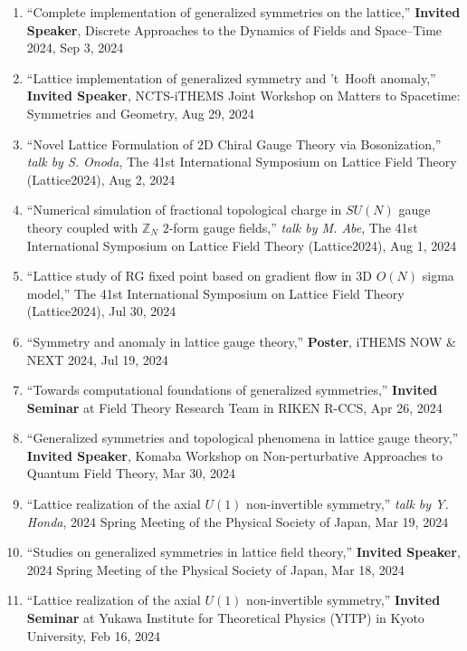 \begin{enumerate}
       \textit{talk by M. Abe},
       2024 Annual (79th) Meeting of the Physical Society of Japan, Sep 16, 2024
 \item ``Complete implementation of generalized symmetries on the lattice,''
       \textbf{Invited Speaker},
       Discrete Approaches to the Dynamics of Fields and Space–Time 2024, Sep 3, 2024
 \item ``Lattice implementation of generalized symmetry and 't~Hooft anomaly,''
       \textbf{Invited Speaker},
       NCTS-iTHEMS Joint Workshop on Matters to Spacetime: Symmetries and Geometry, Aug 29, 2024
 \item ``Novel Lattice Formulation of $2$D Chiral Gauge Theory via Bosonization,''
       \textit{talk by S. Onoda},
       The 41st International Symposium on Lattice Field Theory (Lattice2024), Aug 2, 2024
 \item ``Numerical simulation of fractional topological charge in $SU(N)$ gauge theory coupled with $\mathbb{Z}_N$ $2$-form gauge fields,''
       \textit{talk by M. Abe},
       The 41st International Symposium on Lattice Field Theory (Lattice2024), Aug 1, 2024
 \item ``Lattice study of RG fixed point based on gradient flow in $3$D $O(N)$ sigma model,''
       The 41st International Symposium on Lattice Field Theory (Lattice2024), Jul 30, 2024
 \item ``Symmetry and anomaly in lattice gauge theory,''
       \textbf{Poster}, iTHEMS NOW \& NEXT 2024, Jul 19, 2024
 \item ``Towards computational foundations of generalized symmetries,''
       \textbf{Invited Seminar} at Field Theory Research Team in RIKEN R-CCS, Apr 26, 2024
 \item ``Generalized symmetries and topological phenomena in lattice gauge theory,''
       \textbf{Invited Speaker},
       Komaba Workshop on Non-perturbative Approaches to Quantum Field Theory, Mar 30, 2024
 \item ``Lattice realization of the axial $U(1)$ non-invertible symmetry,''
       \textit{talk by Y. Honda},
       2024 Spring Meeting of the Physical Society of Japan, Mar 19, 2024
 \item ``Studies on generalized symmetries in lattice field theory,''
       \textbf{Invited Speaker},
       2024 Spring Meeting of the Physical Society of Japan, Mar 18, 2024
 \item ``Lattice realization of the axial $U(1)$ non-invertible symmetry,''
       \textbf{Invited Seminar} at Yukawa Institute for Theoretical Physics (YITP) in Kyoto University, Feb 16, 2024

\end{enumerate}
